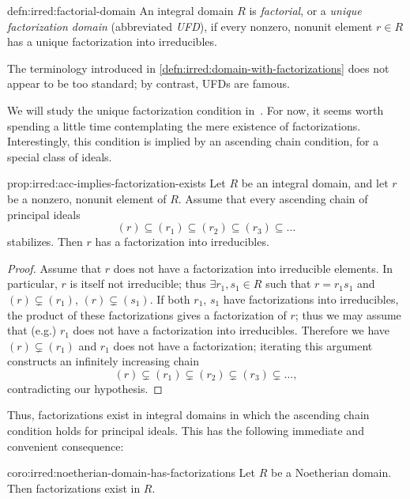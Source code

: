 \begin{defn}{}{defn:irred:factorial-domain}
  An integral domain $R$ is \emph{factorial}, or a \emph{unique
    factorization domain} (abbreviated \emph{UFD}), if every nonzero,
  nonunit element $r \in R$ has a unique factorization into
  irreducibles.
\end{defn}

The terminology introduced in \cref{defn:irred:domain-with-factorizations} does not appear to
be too standard; by contrast, UFDs are famous.

We will study the unique factorization condition
in~. For now, it seems
worth spending a little time contemplating the mere existence of
factorizations. Interestingly, this condition is implied by an
ascending chain condition, for a special class of ideals.

\begin{prop}{}{prop:irred:acc-implies-factorization-exists}
  Let $R$ be an integral domain, and let $r$ be a nonzero, nonunit
  element of $R$. Assume that every ascending chain of principal
  ideals
  \[(r) \subseteq (r_1) \subseteq (r_2) \subseteq (r_3) \subseteq
    \dots\] stabilizes. Then $r$ has a factorization into
  irreducibles.
\end{prop}

\begin{proof}
  Assume that $r$ does not have a factorization into irreducible
  elements. In particular, $r$ is itself not irreducible; thus
  $\exists r_1, s_1 \in R$ such that $r = r_1 s_1$ and
  $(r) \subsetneq (r_1)$, $(r) \subsetneq (s_1)$. If both $r_1$, $s_1$
  have factorizations into irreducibles, the product of these
  factorizations gives a factorization of $r$; thus we may assume that
  (e.g.)  $r_1$ does not have a factorization into
  irreducibles. Therefore we have $(r) \subsetneq (r_1)$ and $r_1$
  does not have a factorization; iterating this argument constructs an
  infinitely increasing chain
  \[(r) \subsetneq (r_1) \subsetneq (r_2) \subsetneq (r_3) \subsetneq
    \dots,\] contradicting our hypothesis.
\end{proof}

Thus, factorizations exist in integral domains in which the ascending
chain condition holds for principal ideals. This has the following
immediate and convenient consequence:

\begin{coro}{}{coro:irred:noetherian-domain-has-factorizations}
  Let $R$ be a Noetherian domain. Then factorizations exist in $R$.
\end{coro}


